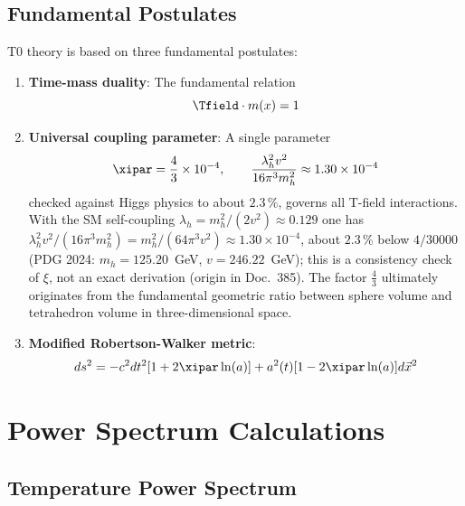 	\subsection{Fundamental Postulates}
	
	T0 theory is based on three fundamental postulates:
	
	\begin{enumerate}
		\item \textbf{Time-mass duality}: The fundamental relation
		\begin{equation}
			\Tfield \cdot m(x) = 1
			\label{eq:time_mass_duality}
		\end{equation}
		
		\item \textbf{Universal coupling parameter}: A single parameter
		\begin{equation}
			\xipar = \frac{4}{3} \times 10^{-4}, \qquad \frac{\lambda_h^2 v^2}{16\pi^3 m_h^2} \approx 1.30 \times 10^{-4}
			\label{eq:xi_definition}
		\end{equation}
		checked against Higgs physics to about $2.3\,\%$, governs all T-field interactions. With the SM self-coupling $\lambda_h = m_h^2/(2v^2) \approx 0.129$ one has $\lambda_h^2 v^2/(16\pi^3 m_h^2) = m_h^2/(64\pi^3 v^2) \approx 1.30 \times 10^{-4}$, about $2.3\,\%$ below $4/30000$ (PDG 2024: $m_h = 125.20$~GeV, $v = 246.22$~GeV); this is a consistency check of $\xi$, not an exact derivation (origin in Doc.~385). The factor $\frac{4}{3}$ ultimately originates from the fundamental geometric ratio between sphere volume and tetrahedron volume in three-dimensional space.
		
		\item \textbf{Modified Robertson-Walker metric}:
		\begin{equation}
			ds^2 = -c^2dt^2[1 + 2\xipar\ln(a)] + a^2(t)[1 - 2\xipar\ln(a)]d\vec{x}^2
			\label{eq:modified_metric}
		\end{equation}
	\end{enumerate}
	
	\section{Power Spectrum Calculations}
	\label{sec:power_spectra}
	
	\subsection{Temperature Power Spectrum}
	
